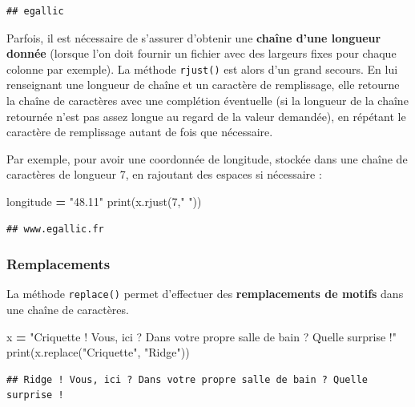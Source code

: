 \documentclass[12pt,]{book}
\newenvironment{Shaded}{\begin{snugshade}}{\end{snugshade}}
\newcommand{\DecValTok}[1]{\textcolor[rgb]{0.00,0.00,0.81}{#1}}
\newcommand{\StringTok}[1]{\textcolor[rgb]{0.31,0.60,0.02}{#1}}
\newcommand{\OperatorTok}[1]{\textcolor[rgb]{0.81,0.36,0.00}{\textbf{#1}}}
\newcommand{\BuiltInTok}[1]{#1}
\newcommand{\NormalTok}[1]{#1}
\numberwithin{equation}{section}
\numberwithin{countremarque}{section}
\begin{document}
\begin{lstlisting}
## egallic
\end{lstlisting}

Parfois, il est nécessaire de s'assurer d'obtenir une \textbf{chaîne
d'une longueur donnée} (lorsque l'on doit fournir un fichier avec des
largeurs fixes pour chaque colonne par exemple). La méthode
\texttt{rjust()} est alors d'un grand secours. En lui renseignant une
longueur de chaîne et un caractère de remplissage, elle retourne la
chaîne de caractères avec une complétion éventuelle (si la longueur de
la chaîne retournée n'est pas assez longue au regard de la valeur
demandée), en répétant le caractère de remplissage autant de fois que
nécessaire.

Par exemple, pour avoir une coordonnée de longitude, stockée dans une
chaîne de caractères de longueur 7, en rajoutant des espaces si
nécessaire :

\begin{Shaded}
\begin{Highlighting}[]
\NormalTok{longitude }\OperatorTok{=} \StringTok{"48.11"}
\BuiltInTok{print}\NormalTok{(x.rjust(}\DecValTok{7}\NormalTok{,}\StringTok{" "}\NormalTok{))}
\end{Highlighting}
\end{Shaded}

\begin{lstlisting}
## www.egallic.fr
\end{lstlisting}

\subsubsection{Remplacements}\label{remplacements}

La méthode \texttt{replace()} permet d'effectuer des
\textbf{remplacements de motifs} dans une chaîne de caractères.

\begin{Shaded}
\begin{Highlighting}[]
\NormalTok{x }\OperatorTok{=} \StringTok{"Criquette ! Vous, ici ? Dans votre propre salle de bain ? Quelle surprise !"}
\BuiltInTok{print}\NormalTok{(x.replace(}\StringTok{"Criquette"}\NormalTok{, }\StringTok{"Ridge"}\NormalTok{))}
\end{Highlighting}
\end{Shaded}

\begin{lstlisting}
## Ridge ! Vous, ici ? Dans votre propre salle de bain ? Quelle surprise !
\end{lstlisting}
\end{document}
